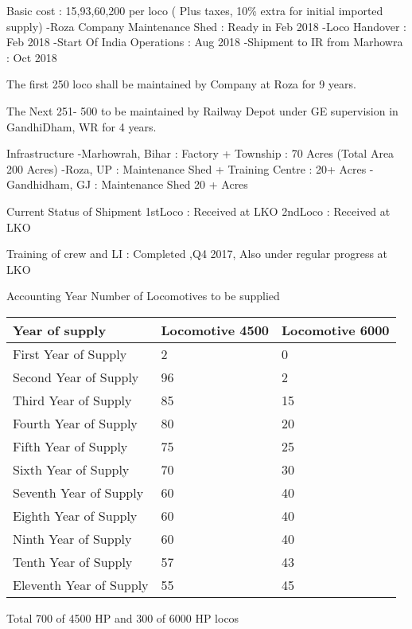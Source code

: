 \documentclass[
  ignorenonframetext,
]{beamer}
\begin{document}
\begin{frame}{Basic cost : 15,93,60,200 per loco ( Plus taxes, 10\%
extra for initial imported supply)}
\protect\hypertarget{basic-cost-159360200-per-loco-plus-taxes-10-extra-for-initial-imported-supply}{}
-Roza Company Maintenance Shed : Ready in Feb 2018 -Loco Handover : Feb
2018 -Start Of India Operations : Aug 2018 -Shipment to IR from Marhowra
: Oct 2018

The first 250 loco shall be maintained by Company at Roza for 9 years.

The Next 251- 500 to be maintained by Railway Depot under GE supervision
in GandhiDham, WR for 4 years.

Infrastructure -Marhowrah, Bihar : Factory + Township : 70 Acres (Total
Area 200 Acres) -Roza, UP : Maintenance Shed + Training Centre : 20+
Acres -Gandhidham, GJ : Maintenance Shed 20 + Acres
\end{frame}

\begin{frame}{Current Status of Shipment}
\protect\hypertarget{current-status-of-shipment}{}
1stLoco : Received at LKO 2ndLoco : Received at LKO

Training of crew and LI : Completed ,Q4 2017, Also under regular
progress at LKO

Accounting Year Number of Locomotives to be supplied

\begin{longtable}[]{@{}lll@{}}
\toprule()
Year of supply & Locomotive 4500 & Locomotive 6000 \\
\midrule()
\endhead
First Year of Supply & 2 & 0 \\
Second Year of Supply & 96 & 2 \\
Third Year of Supply & 85 & 15 \\
Fourth Year of Supply & 80 & 20 \\
Fifth Year of Supply & 75 & 25 \\
Sixth Year of Supply & 70 & 30 \\
Seventh Year of Supply & 60 & 40 \\
Eighth Year of Supply & 60 & 40 \\
Ninth Year of Supply & 60 & 40 \\
Tenth Year of Supply & 57 & 43 \\
Eleventh Year of Supply & 55 & 45 \\
\bottomrule()
\end{longtable}

Total 700 of 4500 HP and 300 of 6000 HP locos

\end{frame}
\end{document}
